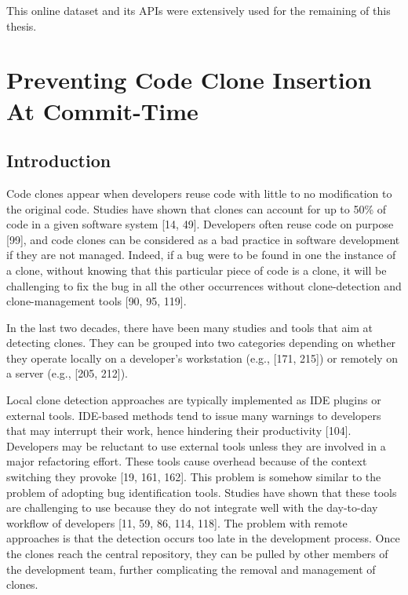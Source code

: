 \documentclass[12pt]{report}
\begin{document}
This online dataset and its APIs were extensively used for the remaining
of this thesis.

\chapter{Preventing Code Clone Insertion At
Commit-Time}\label{preventing-code-clone-insertion-at-commit-time}

\section{Introduction}\label{introduction-2}

Code clones appear when developers reuse code with little to no
modification to the original code. Studies have shown that clones can
account for up to 50\% of code in a given software system {[}14, 49{]}.
Developers often reuse code on purpose {[}99{]}, and code clones can be
considered as a bad practice in software development if they are not
managed. Indeed, if a bug were to be found in one the instance of a
clone, without knowing that this particular piece of code is a clone, it
will be challenging to fix the bug in all the other occurrences without
clone-detection and clone-management tools {[}90, 95, 119{]}.

In the last two decades, there have been many studies and tools that aim
at detecting clones. They can be grouped into two categories depending
on whether they operate locally on a developer's workstation (e.g.,
{[}171, 215{]}) or remotely on a server (e.g., {[}205, 212{]}).

Local clone detection approaches are typically implemented as IDE
plugins or external tools. IDE-based methods tend to issue many warnings
to developers that may interrupt their work, hence hindering their
productivity {[}104{]}. Developers may be reluctant to use external
tools unless they are involved in a major refactoring effort. These
tools cause overhead because of the context switching they provoke
{[}19, 161, 162{]}. This problem is somehow similar to the problem of
adopting bug identification tools. Studies have shown that these tools
are challenging to use because they do not integrate well with the
day-to-day workflow of developers {[}11, 59, 86, 114, 118{]}. The
problem with remote approaches is that the detection occurs too late in
the development process. Once the clones reach the central repository,
they can be pulled by other members of the development team, further
complicating the removal and management of clones.
\end{document}
